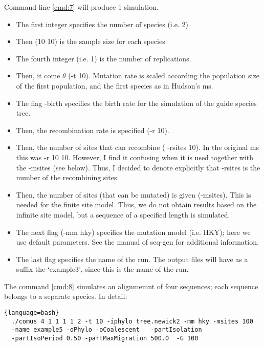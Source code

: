 Command line \ref{cmd:7} will produce 1 simulation. 
\begin{itemize}
\item The first integer specifies the number of species (i.e. 2)
\item Then (10 10) is the sample size for each species
\item The fourth integer (i.e. 1) is the number of replications. 
\item Then, it come $\theta$ (-t 10). Mutation rate is scaled according the population size of the first population, and the first species as in Hudson's ms. 
\item The flag -birth specifies the birth rate for the simulation of the guide species tree.
\item Then, the recombination rate is specified (-r 10). 
\item Then, the number of sites that can recombine ( -rsites 10). In the original ms this was -r 10 10. However, I find it confusing when it is used together with the -msites (see below). Thus, I decided to denote explicitly that -rsites is the number of the recombining sites. 
\item Then, the number of sites (that can be mutated) is given (-msites). This is needed for the finite site model. Thus, we do not obtain results based on the infinite site model, but a sequence of a specified length is simulated. 
\item The next flag (-mm hky) specifies the mutation model (i.e. HKY); here we use default parameters. See the manual of seq-gen for additional information. 
\item The last flag specifies the name of the run. The output files will have as a suffix the `example3', since this is the name of the run. 
\end{itemize}


The command \ref{cmd:8} simulates an alignmemnt of four sequences; each sequence belongs to a separate species. In detail:

\begin{lstlisting}[label=cmd:8, caption={Two species, user-defined phylogenetic tree}]{language=bash}
  ./comus 4 1 1 1 1 2 -t 10 -iphylo tree.newick2 -mm hky -msites 100 
  -name example5 -oPhylo -oCoalescent   -partIsolation 
  -partIsoPeriod 0.50 -partMaxMigration 500.0  -G 100
\end{lstlisting}


